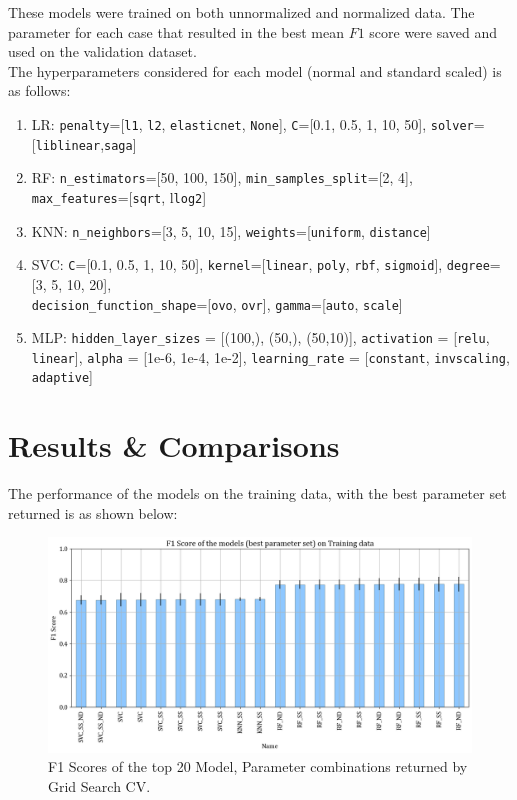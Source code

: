 \documentclass[11pt,a4paper]{article}
\newcommand{\noi}{\noindent}
\begin{document}
\noi
These models were trained on both unnormalized and normalized data. The parameter for each case that resulted in the best mean $F1$ score were saved and used on the validation dataset.\\

\noi
The hyperparameters considered for each model (normal and standard scaled) is as follows:
\begin{enumerate}
	\item LR: \texttt{penalty}=[\texttt{l1}, \texttt{l2}, \texttt{elasticnet}, \texttt{None}], \texttt{C}=[0.1, 0.5, 1, 10, 50], \texttt{solver}=[\texttt{liblinear},\texttt{saga}]
	\item RF: \texttt{n\_estimators}=[50, 100, 150], \texttt{min\_samples\_split}=[2, 4], \texttt{max\_features}=[\texttt{sqrt}, l\texttt{log2}]
	\item KNN: \texttt{n\_neighbors}=[3, 5, 10, 15], \texttt{weights}=[\texttt{uniform}, \texttt{distance}]
	\item SVC: \texttt{C}=[0.1, 0.5, 1, 10, 50], \texttt{kernel}=[\texttt{linear}, \texttt{poly}, \texttt{rbf}, \texttt{sigmoid}], \texttt{degree}=[3, 5, 10, 20], \\
	\texttt{decision\_function\_shape}=[\texttt{ovo}, \texttt{ovr}], \texttt{gamma}=[\texttt{auto}, \texttt{scale}]
	\item MLP: \texttt{hidden\_layer\_sizes} = [(100,), (50,), (50,10)], \texttt{activation} = [\texttt{relu}, \texttt{linear}], \texttt{alpha} = [1e-6, 1e-4, 1e-2], \texttt{learning\_rate} = [\texttt{constant}, \texttt{invscaling}, \texttt{adaptive}]
\end{enumerate}

\section{Results \& Comparisons}
The performance of the models on the training data, with the best parameter set returned is as shown below:
\begin{figure}[H]
	\centering
	\includegraphics[scale=0.5]{images/top_20_models.png}
	\caption{F1 Scores of the top 20 Model, Parameter combinations returned by Grid Search CV.}
	\label{fig:best_models}
\end{figure}
\end{document}
